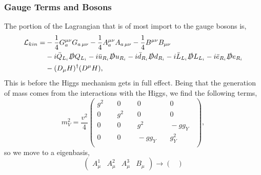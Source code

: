 \documentclass[10pt,xcolor=dvipsnames,mathserif]{beamer}
\begin{document}
\begin{frame}
\frametitle{Gauge Terms and Bosons}

The portion of the Lagrangian that is of most import to the gauge bosons is, 
%
\begin{align}
\label{eq:KinSM}
\mathcal{L}_{kin} = & - \frac{1}{4} G^{\mu \nu}_a G_{a \, \mu \nu}  - \frac{1}{4}  A^{\mu \nu}_a A_{a \,\mu \nu}  
- \frac{1}{4}  B^{\mu \nu} B_{\mu \nu} \nonumber \\ 
& -i \bar{Q}_{L_i} \slashed{D} Q_{L_i} 
-i \bar{u}_{R_i} \slashed{D} u_{R_i}  
-i \bar{d}_{R_i} \slashed{D} d_{R_i}  
-i \bar{L}_{L_i} \slashed{D} L_{L_i}    
-i \bar{e}_{R_i} \slashed{D} e_{R_i}   \\
& - (D_\mu H)^\dagger ( D^\mu H ) ,  \nonumber 
\end{align}
This is before the Higgs mechanism gets in full effect. Being that the generation of mass comes from the interactions with the Higgs, we find the following terms, 
\begin{equation}
m_V^2 =
\dfrac{v^2}{4}
\begin{pmatrix}
g^2 \;\;&\;\; 0 \;\;&\;\; 0 \;\;&\;\; 0 \;\; \\
0 \;\;&\;\; g^2 \;\;&\;\; 0 \;\;&\;\; 0 \;\; \\
0 \;\;&\;\; 0 \;\;&\;\; g^2 \;\;&\;\; -g g_{Y} \;\; \\
0 \;\;&\;\; 0 \;\;&\;\; -g g_{Y} \;\;&\;\; g_{Y}^2 \;\; \\
\end{pmatrix} , 
\end{equation}
so we move to a eigenbasis, 
\begin{equation}
\begin{pmatrix}
	A_\mu^1 & A_\mu^2 & A_\mu^3 &  B_\mu
\end{pmatrix} \rightarrow \begin{pmatrix}

\end{pmatrix}
\end{equation}



\end{frame}
\end{document}
